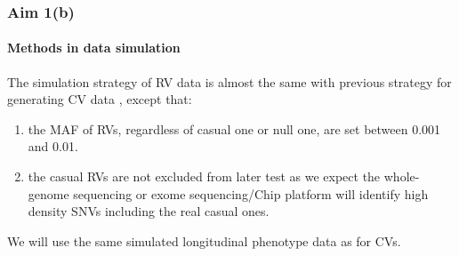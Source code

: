 \documentclass[compress]{beamer}
\begin{document}
\begin{frame}[allowframebreaks]
\frametitle{Aim 1(b)}
\framesubtitle{Methods in data simulation}
\scriptsize
The simulation strategy of RV data is almost the same with previous strategy for generating CV data , except that:
\begin{enumerate}
\item the MAF of RVs, regardless of casual one or null one, are set between 0.001 and 0.01.
\item the casual RVs are not excluded from later test as we expect the whole-genome sequencing or exome sequencing/Chip platform will identify high density SNVs including the real casual ones.
\end{enumerate}
We will use the same simulated longitudinal phenotype data as for CVs.
\end{frame}
\end{document}
